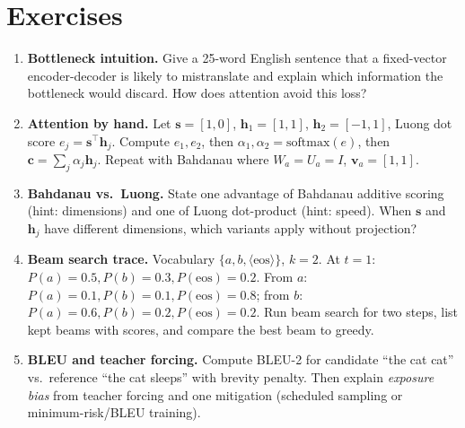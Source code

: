 \section{Exercises}
\label{sec:ch06-exercises}
\begin{enumerate}[label=E6.\arabic*, leftmargin=*, itemsep=0.7em]
    \item \textbf{Bottleneck intuition.} Give a 25-word English sentence that a fixed-vector encoder-decoder is likely to mistranslate and explain which information the bottleneck would discard. How does attention avoid this loss?
    \item \textbf{Attention by hand.} Let $\mathbf{s}=[1,0]$, $\mathbf{h}_1=[1,1]$, $\mathbf{h}_2=[-1,1]$, Luong dot score $e_j=\mathbf{s}^\top\mathbf{h}_j$. Compute $e_1,e_2$, then $\alpha_1,\alpha_2=\mathrm{softmax}(e)$, then $\mathbf{c}=\sum_j\alpha_j\mathbf{h}_j$. Repeat with Bahdanau where $W_a=U_a=I$, $\mathbf{v}_a=[1,1]$.
    \item \textbf{Bahdanau vs.\ Luong.} State one advantage of Bahdanau additive scoring (hint: dimensions) and one of Luong dot-product (hint: speed). When $\mathbf{s}$ and $\mathbf{h}_j$ have different dimensions, which variants apply without projection?
    \item \textbf{Beam search trace.} Vocabulary $\{a,b,\langle\text{eos}\rangle\}$, $k=2$. At $t{=}1$: $P(a)=0.5, P(b)=0.3, P(\text{eos})=0.2$. From $a$: $P(a)=0.1,P(b)=0.1,P(\text{eos})=0.8$; from $b$: $P(a)=0.6,P(b)=0.2,P(\text{eos})=0.2$. Run beam search for two steps, list kept beams with scores, and compare the best beam to greedy.
    \item \textbf{BLEU and teacher forcing.} Compute BLEU-2 for candidate ``the cat cat'' vs.\ reference ``the cat sleeps'' with brevity penalty. Then explain \emph{exposure bias} from teacher forcing and one mitigation (scheduled sampling or minimum-risk/BLEU training).
\end{enumerate}
